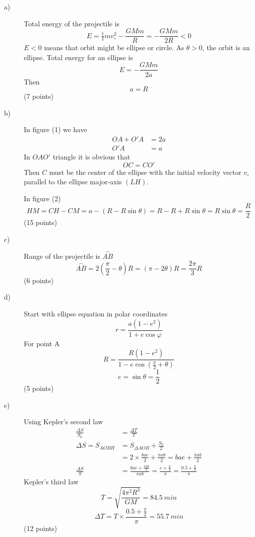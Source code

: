 \begin{description}
\item[a)] Total energy of the projectile is
\[
  E = \tfrac{1}{2}mv_\circ^2 - \frac{GMm}{R} = -\frac{GMm}{2R} < 0
\]
$E < 0$ means that orbit might be ellipse or circle. As $\theta > 0$, the
orbit is an ellipse. Total energy for an ellipse is
\[
  E = -\frac{GMm}{2a}
\]
Then
\[
  a = R
\]
\hfill(7 points)

\item[b)] In figure (1) we have
\begin{align*}
  OA + O'A &= 2a \\
  O'A &= a
\end{align*}
In $OAO'$ triangle it is obvious that
\[
  OC = CO'
\]
Then $C$ must be the center of the ellipse with the initial velocity vector
$v_\circ$ parallel to the ellipse major-axis $(LH)$.

In figure (2)
\[
  HM = CH - CM = a - (R - R\sin\theta) = R - R + R\sin\theta
     = R\sin\theta = \frac{R}{2}
\]
\hfill(15 points)

\item[c)] Range of the projectile is $\overset{\frown}{AB}$
\[
  \overset{\frown}{AB} = 2\left(\frac{\pi}{2} - \theta\right)R
  = (\pi - 2\theta)R = \frac{2\pi}{3}R
\]
\hfill(6 points)

\item[d)]
Start with ellipse equation in polar coordinates
\[
  r = \frac{a(1 - e^2)}{1 + e\cos\varphi}
\]
For point A
\[
  R = \frac{R(1 - e^2)}{1 - e\cos(\frac{\pi}{2} + \theta)}
\]
\[
  e = \sin\theta = \frac{1}{2}
\]
\hfill(5 points)

\item[e)] Using Kepler's second law
\begin{align*}
  \frac{\Delta S}{S_0} &= \frac{\Delta T}{T} \\
  \Delta S = S_{AOBH} &= S_{\Delta AOB} + \frac{S_0}{2} \\
  &= 2\times\frac{bae}{2} + \frac{\pi ab}{2}
   = bae + \frac{\pi ab}{2} \\
  \frac{\Delta S}{S} &= \frac{bae + \frac{\pi ab}{2}}{\pi ab}
   = \frac{e + \frac{\pi}{2}}{\pi} = \frac{0.5 + \frac{\pi}{2}}{\pi}
\end{align*}
Kepler's third law
\[
  T = \sqrt{\frac{4\pi^2 R^3}{GM}} = 84.5\ min
\]
\[
  \Delta T = T\times\frac{0.5 + \frac{\pi}{2}}{\pi} = 55.7\ min
\]
\hfill(12 points)
\end{description}


